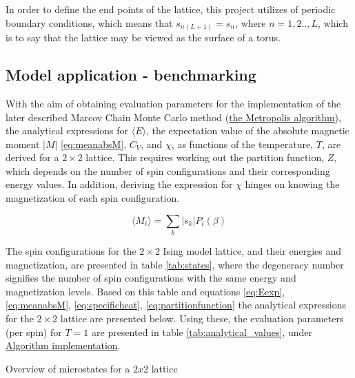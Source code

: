 \documentclass[%
oneside,                 %
final,                   %
10pt]{article}
\begin{document}
In order to define the end points of the lattice, this project utilizes of periodic boundary conditions, which means that $s_{n(L+1)}=s_{n}$, where $n=1,2..,L$, which is to say that the lattice may be viewed as the surface of a torus.  

\subsection{Model application - benchmarking}
\label{SS:M.Model_application}
With the aim of obtaining evaluation parameters for the implementation of the later described Marcov Chain Monte Carlo method (\hyperref[SS:MCMCmethod]{the Metropolis algorithm}), the analytical expressions for $\langle E \rangle$, the expectation value of the absolute magnetic moment $|M|$ \eqref{eq:meanabsM}, $C_V$, and $\chi$, as functions of the temperature, $T$, are derived for a $2 \times 2$ lattice. This requires working out the  partition function, $Z$, which depends on the number of spin configurations and their corresponding energy values. In addition, deriving the expression for $\chi$ hinges on knowing the magnetization of each spin configuration. \newline

\begin{equation}
\langle M_i \rangle =\sum_{k} |s_k| P_i(\beta)
\label{eq:meanabsM}
\end{equation}

The spin configurations for the $2 \times 2$ Ising model lattice, and their energies and magnetization, are presented in table \ref{tab:states}, where the degeneracy number signifies the number of spin configurations with the same energy and magnetization levels. Based on this table and equations \eqref{eq:Eexp}, \eqref{eq:meanabsM}, \ref{eq:specificheat}, \eqref{eq:partitionfunction} the analytical expressions for the $2 \times 2$ lattice are presented below. Using these, the evaluation parameters (per spin) for $T=1$ are presented in table \ref{tab:analytical_values}, under \hyperref[SS:init.algo.impl]{Algorithm implementation}.\newline

\begin{table}[h!tb]
    \centering
    \caption{Overview of microstates for a $2x2$ lattice}
\label{tab:states}
\end{table}
\end{document}
